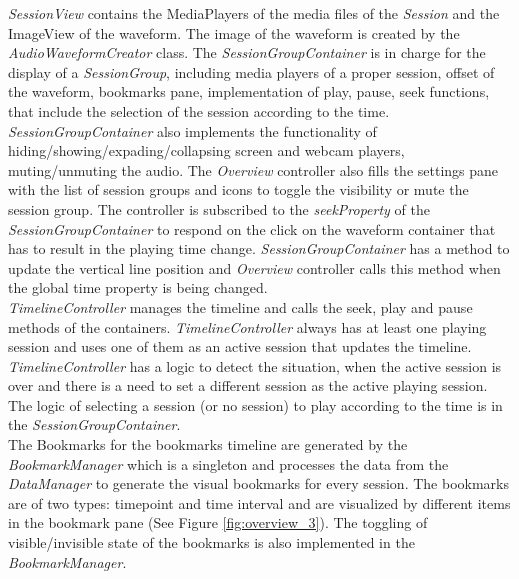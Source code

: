 \textit{SessionView} contains the MediaPlayers of the media files of the \textit{Session} and the ImageView of the waveform. The image of the waveform is created by the \textit{AudioWaveformCreator} class. The \textit{SessionGroupContainer} is in charge for the display of a \textit{SessionGroup}, including media players of a proper session, offset of the waveform, bookmarks pane, implementation of play, pause, seek functions, that include the selection of the session according to the time. \textit{SessionGroupContainer} also implements the functionality of hiding/showing/expading/collapsing screen and webcam players, muting/unmuting the audio. The \textit{Overview} controller also fills the settings pane with the list of session groups and icons to toggle the visibility or mute the session group. The controller is subscribed to the \textit{seekProperty} of the \textit{SessionGroupContainer} to respond on the click on the waveform container that has to result in the playing time change. \textit{SessionGroupContainer} has a method to update the vertical line position and \textit{Overview} controller calls this method when the global time property is being changed. \\

\textit{TimelineController} manages the timeline and calls the seek, play and pause methods of the containers. \textit{TimelineController} always has at least one playing session and uses one of them as an active session that updates the timeline. \textit{TimelineController} has a logic to detect the situation, when the active session is over and there is a need to set a different session as the active playing session. The logic of selecting a session (or no session) to play according to the time is in the \textit{SessionGroupContainer}.\\

The Bookmarks for the bookmarks timeline are generated by the \textit{BookmarkManager} which is a singleton and processes the data from the \textit{DataManager} to generate the visual bookmarks for every session. The bookmarks are of two types: timepoint and time interval and are visualized by different items in the bookmark pane (See Figure \ref{fig:overview_3}). The toggling of visible/invisible state of the bookmarks is also implemented in the \textit{BookmarkManager}. \\



